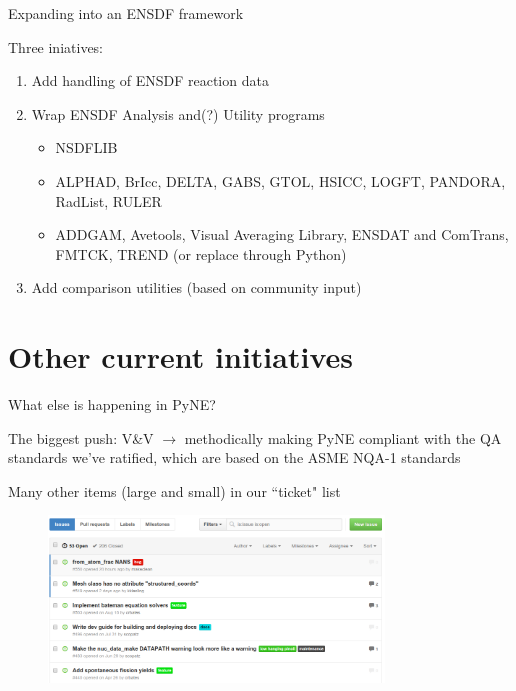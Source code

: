 \documentclass[xcolor=x11names,compress]{beamer}
\renewcommand{\(}{\begin{columns}}
\renewcommand{\)}{\end{columns}}
\newcommand{\<}[1]{\begin{column}{#1}}
\renewcommand{\>}{\end{column}}
\begin{document}
\begin{frame}{Expanding into an ENSDF framework}

    Three iniatives:
    \begin{enumerate}
        \item Add handling of ENSDF \alert{reaction} data
        
        \item Wrap ENSDF \alert{Analysis} and(?) \alert{Utility} programs
        \begin{itemize}
            \item NSDFLIB
            \item ALPHAD, BrIcc, DELTA, GABS, GTOL, HSICC, LOGFT,
            PANDORA, RadList, RULER
            \item ADDGAM, Avetools, Visual Averaging Library, ENSDAT 
            and ComTrans, FMTCK, TREND (or replace through Python)
        \end{itemize}
        
        \item Add comparison utilities (based on \alert{community input})
    \end{enumerate}
    
\end{frame}

\section{Other current initiatives}
\begin{frame}{What else is happening in PyNE?}

    The biggest push: \alert{V\&V} $\rightarrow$ methodically making PyNE compliant
    with the QA standards we've ratified, which are based on the ASME NQA-1 standards
    \cite{pyne_vnv}

    \vspace*{1 em}
    Many other items (large and small) in our ``ticket" list

    \begin{center}
 	\begin{figure}
 	\includegraphics[height=1.75in,clip]{../figs/PyNE-tickets}
    \end{figure}
 	\end{center}

\end{frame}
\end{document}
